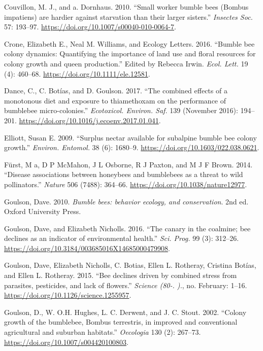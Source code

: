 \documentclass[11pt,]{article}
\begin{document}
\leavevmode\hypertarget{ref-Couvillon2010}{}%
Couvillon, M. J., and a. Dornhaus. 2010. ``Small worker bumble bees
(Bombus impatiens) are hardier against starvation than their larger
sisters.'' \emph{Insectes Soc.} 57: 193--97.
\url{https://doi.org/10.1007/s00040-010-0064-7}.

\leavevmode\hypertarget{ref-Crone2016}{}%
Crone, Elizabeth E., Neal M. Williams, and Ecology Letters. 2016.
``Bumble bee colony dynamics: Quantifying the importance of land use and
floral resources for colony growth and queen production.'' Edited by
Rebecca Irwin. \emph{Ecol. Lett.} 19 (4): 460--68.
\url{https://doi.org/10.1111/ele.12581}.

\leavevmode\hypertarget{ref-Dance2017}{}%
Dance, C., C. Botías, and D. Goulson. 2017. ``The combined effects of a
monotonous diet and exposure to thiamethoxam on the performance of
bumblebee micro-colonies.'' \emph{Ecotoxicol. Environ. Saf.} 139
(November 2016): 194--201.
\url{https://doi.org/10.1016/j.ecoenv.2017.01.041}.

\leavevmode\hypertarget{ref-Elliott2009}{}%
Elliott, Susan E. 2009. ``Surplus nectar available for subalpine bumble
bee colony growth.'' \emph{Environ. Entomol.} 38 (6): 1680--9.
\url{https://doi.org/10.1603/022.038.0621}.

\leavevmode\hypertarget{ref-Furst2014}{}%
Fürst, M a, D P McMahon, J L Osborne, R J Paxton, and M J F Brown. 2014.
``Disease associations between honeybees and bumblebees as a threat to
wild pollinators.'' \emph{Nature} 506 (7488): 364--66.
\url{https://doi.org/10.1038/nature12977}.

\leavevmode\hypertarget{ref-Goulson2008}{}%
Goulson, Dave. 2010. \emph{Bumble bees: behavior ecology, and
conservation}. 2nd ed. Oxford University Press.

\leavevmode\hypertarget{ref-Goulson2016}{}%
Goulson, Dave, and Elizabeth Nicholls. 2016. ``The canary in the
coalmine; bee declines as an indicator of environmental health.''
\emph{Sci. Prog.} 99 (3): 312--26.
\url{https://doi.org/10.3184/003685016X14685000479908}.

\leavevmode\hypertarget{ref-Goulson2015c}{}%
Goulson, Dave, Elizabeth Nicholls, C. Botias, Ellen L. Rotheray,
Cristina Botías, and Ellen L. Rotheray. 2015. ``Bee declines driven by
combined stress from parasites, pesticides, and lack of flowers.''
\emph{Science (80-. ).}, no. February: 1--16.
\url{https://doi.org/10.1126/science.1255957}.

\leavevmode\hypertarget{ref-Goulson2002c}{}%
Goulson, D., W. O.H. Hughes, L. C. Derwent, and J. C. Stout. 2002.
``Colony growth of the bumblebee, Bombus terrestris, in improved and
conventional agricultural and suburban habitats.'' \emph{Oecologia} 130
(2): 267--73. \url{https://doi.org/10.1007/s004420100803}.
\end{document}
